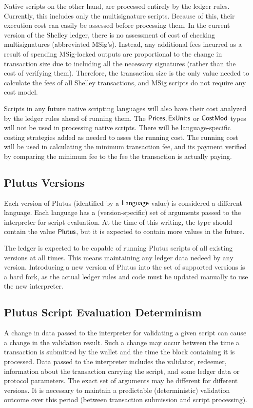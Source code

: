 Native scripts on the other hand, are processed entirely by the ledger rules.
Currently, this includes only the multisignature scripts.
Because of this, their execution cost can easily be assessed before processing them.
In the current version of the Shelley ledger, there is no assessment of cost
of checking multisignatures (abbreviated MSig's). Instead, any additional fees 
incurred as a result of
spending MSig-locked outputs are proportional to the change in transaction
size due to including all the necessary signatures (rather than the
cost of verifying them). Therefore, the transaction size is the only
value needed to calculate the fees of all Shelley transactions, and MSig
scripts do not require any cost model.

Scripts in any future native scripting languages will also
have their cost analyzed by the ledger rules ahead of running them.
The $\mathsf{Prices}, \mathsf{ExUnits}$ or $\mathsf{CostMod}$ types will not be used
in processing native scripts. There will be language-specific
costing strategies added as needed to asses the running cost.
The running cost will be used in calculating the minimum transaction
fee, and its payment verified by comparing the minimum fee to the fee the transaction
is actually paying.

\subsection{Plutus Versions}
\label{sec:versions}

Each
version of Plutus (identified by a $\mathsf{Language}$ value) is considered a different
language. Each language
has a (version-specific) set of arguments passed to the interpreter
for script evaluation. At the time of this writing, the type should contain
the value $\mathsf{Plutus}$, but it is expected to contain more values in the future.

The ledger is expected to be capable of running Plutus scripts of
all existing versions at all times. This means maintaining any ledger
data nedeed by any version. Introducing a new version of Plutus
into the set of supported versions is a hard fork, as the actual ledger rules
and code must be updated manually to use the new interpreter.

\subsection{Plutus Script Evaluation Determinism}
\label{sec:determinism}

A change in data passed to the interpreter for
validating a given script can cause a change in the validation result. Such
a change may occur between the time a transaction is submitted by the wallet
and the time the block containing it is processed. Data passed to the interpreter
includes the validator, redeemer, information about the transaction carrying
the script, and some ledger data or protocol parameters.
The exact set of arguments may be different for different versions.
It is necessary to maintain a predictable
(deterministic) validation outcome over this period (between transaction
submission and script processing).

